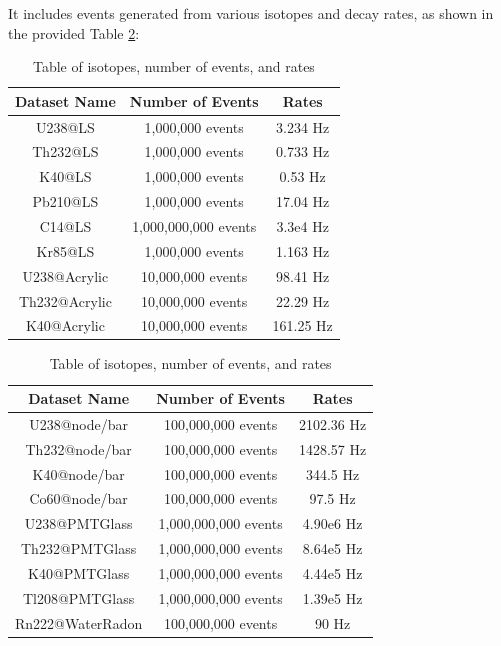 It includes events generated from various isotopes and decay rates, as shown in the provided Table \ref{tab:BKG_gen}:

\begin{table}[htp]
	\hspace{-1.3cm}
	\begin{minipage}[t]{0.45\linewidth}
		\centering
		\small
		\begin{tabular}{ccc}
			\toprule
			\textbf{Dataset Name} & \textbf{Number of Events} & \textbf{Rates} \\
			\midrule
			U238@LS & 1,000,000 events & 3.234 Hz \\
			Th232@LS & 1,000,000 events & 0.733 Hz \\
			K40@LS & 1,000,000 events & 0.53 Hz \\
			Pb210@LS & 1,000,000 events & 17.04 Hz \\
			C14@LS & 1,000,000,000 events & 3.3e4 Hz \\
			Kr85@LS & 1,000,000 events & 1.163 Hz \\
			U238@Acrylic & 10,000,000 events & 98.41 Hz \\
			Th232@Acrylic & 10,000,000 events & 22.29 Hz \\
			K40@Acrylic & 10,000,000 events & 161.25 Hz \\
			\bottomrule
		\end{tabular}
	\end{minipage}
\hspace{1.2cm}
	\begin{minipage}[t]{0.45\linewidth}
		\centering
		\small
		\begin{tabular}{ccc}
			\toprule
			\textbf{Dataset Name} & \textbf{Number of Events} & \textbf{Rates}  \\
			\midrule
			U238@node/bar & 100,000,000 events & 2102.36 Hz \\
			Th232@node/bar & 100,000,000 events & 1428.57 Hz \\
			K40@node/bar & 100,000,000 events & 344.5 Hz \\
			Co60@node/bar & 100,000,000 events & 97.5 Hz \\
			U238@PMTGlass & 1,000,000,000 events & 4.90e6 Hz \\
			Th232@PMTGlass & 1,000,000,000 events & 8.64e5 Hz \\
			K40@PMTGlass & 1,000,000,000 events & 4.44e5 Hz \\
			Tl208@PMTGlass & 1,000,000,000 events & 1.39e5 Hz \\
			Rn222@WaterRadon & 100,000,000 events & 90 Hz \\
			\bottomrule
		\end{tabular}
	\end{minipage}
	\caption{Table of isotopes, number of events, and rates }
	\label{tab:BKG_gen}
\end{table}

